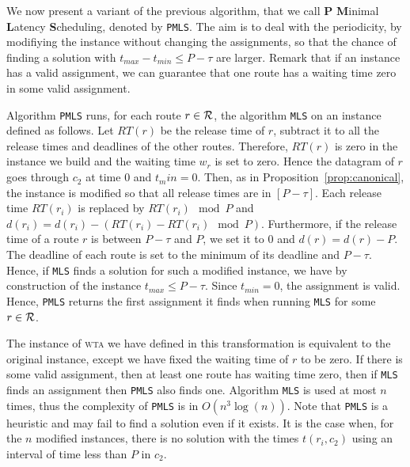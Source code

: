 \documentclass[a4paper,10pt]{article}
\newcommand\MLS{\texttt{MLS}\xspace}
\newcommand\PMLS{\texttt{PMLS}\xspace}
\newcommand\wta{\textsc{wta}\xspace}
\begin{document}
     We now present a variant of the previous algorithm, that we call
     \textbf{P} \textbf{M}inimal \textbf{L}atency \textbf{S}cheduling, denoted by \PMLS. The aim is to deal with the periodicity, by modifiying the instance without changing the assignments, so that the chance of finding a solution with $t_{max}- t_{min} \leq P -\tau $ are larger.  Remark that if an instance has a valid assignment, we can guarantee that one route has a waiting time zero in some valid assignment. 
     
     Algorithm \PMLS runs, for each route $r \in \cal{R}$, the algorithm \MLS on an instance defined as follows. Let $RT(r)$ be the release time of $r$, subtract it to all the release times and deadlines of the other routes. Therefore, $RT(r)$ is zero in the instance we build and the waiting time $w_r$ is set to zero. Hence the datagram of $r$ goes through $c_2$ at time $0$ and $t_min = 0$.
     Then, as in Proposition~\ref{prop:canonical}, the instance is modified so that all release times are in $[P-\tau]$. Each release time $RT(r_i)$ is replaced by $RT(r_i) \mod P$ and $d(r_i) = d(r_i) - (RT(r_i) - RT(r_i) \mod P)$. Furthermore, if the release time of a route $r$ is between $P-\tau$ and $P$, we set it to $0$ and $d(r) = d(r) - P$.  The deadline of each route is set to the minimum of its deadline and $P - \tau$. Hence, if \MLS finds a solution for such a modified instance, we have by construction of the instance $t_{max} \leq P -\tau $. Since $t_{min} = 0$, the assignment is valid. Hence, \PMLS
     returns the first assignment it finds when running \MLS for some $r \in \cal{R}$.

     The instance of \wta we have defined in this transformation is equivalent 
     to the original instance, except we have fixed the waiting time of 
     $r$ to be zero. If there is some valid assignment, then at least one route has waiting time zero, then if \MLS finds an assignment then \PMLS also finds one. Algorithm \MLS is used at most $n$ times, thus the complexity of \PMLS is in $O(n^3\log(n))$. Note that \PMLS is a heuristic and may fail to find a solution even if it exists. It is the case when, for the $n$ modified instances, there is no solution with the times $t(r_i,c_2)$ using an interval of time less than $P$ in $c_2$. 
\end{document}
